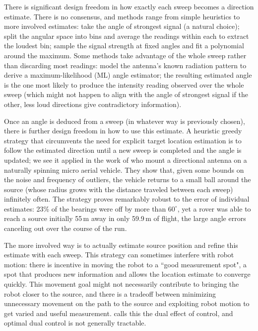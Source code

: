\documentclass[journal,a4paper]{IEEEtran}
\begin{document}
There is significant design freedom in how exactly each sweep becomes a direction estimate. There is no consensus, and methods range from simple heuristics to more involved estimates: \citet{graefenstein2009wireless}
take the angle of strongest signal (a natural choice); \citet{venkateswaran2013rf} split the angular space into bins and average the readings within each to extract the loudest bin; \citet{tokekar2011active} sample the signal strength at
fixed angles and fit a polynomial around the maximum. Some methods take advantage of the whole sweep rather than discarding most readings: \citet{singleantenna2025} model the antenna's known radiation pattern to derive a maximum-likelihood (ML) angle estimator; the resulting estimated angle is the one most likely to produce the intensity reading observed over the whole sweep (which might not happen to align with the angle of strongest signal if the other, less loud directions give contradictory information).

Once an angle is deduced from a sweep (in whatever way is previously chosen), there is further design freedom in how to use this estimate. A heuristic greedy strategy that circumvents the need for explicit target location estimation is to follow the estimated direction until a new sweep is completed and the angle is updated; we see it applied in the work of \citet{venkateswaran2013rf} who mount a directional
antenna on a naturally spinning micro aerial vehicle. They show that, given some bounds on the noise and frequency of outliers, the vehicle returns to a small ball around the source (whose radius grows with the distance traveled between each sweep) infinitely often. The strategy proves remarkably robust to the error of individual estimates: 23\% of
the bearings were off by more than $60^\circ$, yet a rover was able to reach a source initially 55\,m away in only 59.9\,m of flight, the large angle errors canceling out over the course of the run. 

The more involved way is to actually estimate source position and refine this estimate with each sweep. This strategy can sometimes interfere with robot motion: there is incentive in moving the robot to a ``good measurement spot", a spot that produces new information and allows the location estimate to converge quickly. This movement goal might not necessarily contribute to bringing the robot closer to the source, and there is a tradeoff between minimizing unnecessary movement on the path to the source and exploiting robot motion to get varied and useful measurement. \citet{feldbaum1960dual} calls this the dual effect of control, and optimal dual control is not generally tractable.
\end{document}
